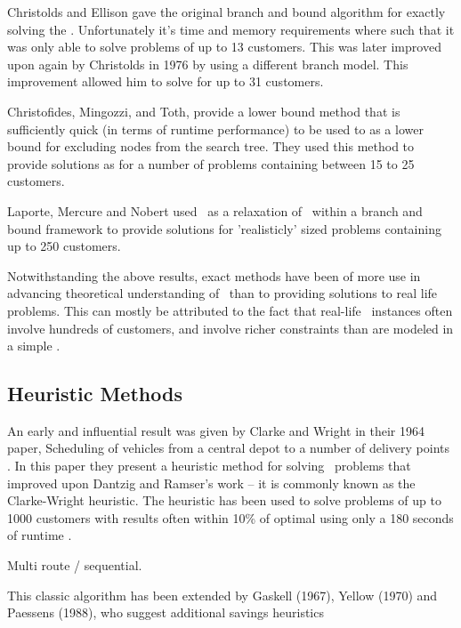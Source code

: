 Christolds and Ellison gave the original branch and bound algorithm for exactly solving the \VRP \cite{CE:1969}. Unfortunately it's time and memory requirements where such that it was only able to solve problems of up to 13 customers. This was later improved upon again by Christolds in 1976 by using a different branch model. This improvement allowed him to solve for up to 31 customers. 

Christofides, Mingozzi, and Toth, \cite{CMT:1981} provide a lower bound method that is sufficiently quick (in terms of runtime performance) to be used to as a lower bound for excluding nodes from the search tree. They used this method to provide solutions as for a number of problems containing between 15 to 25 customers.    
  
Laporte, Mercure and Nobert \cite{LMN:1986} used \MTSP\ as a relaxation of \VRP\ within a branch and bound framework to provide solutions for 'realisticly' sized problems containing up to 250 customers.  

Notwithstanding the above results, exact methods have been of more use in advancing theoretical understanding of \VRP\ than to providing solutions to real life problems. This can mostly be attributed to the fact that real-life \VRP\ instances often involve hundreds of customers, and involve richer constraints than are modeled in a simple \VRP.

\subsection{Heuristic Methods}
An early and influential result was given by Clarke and Wright in their 1964 paper, Scheduling of vehicles from a central depot to a number of delivery points \cite{clark:1964}. In this paper they present a heuristic method for solving \VRP\ problems that improved upon Dantzig and Ramser's work -- it is commonly known as the Clarke-Wright heuristic. The heuristic has been used to solve problems of up to 1000 customers with results often within 10\% of optimal using only a 180 seconds of runtime \cite{TV2001}.

Multi route / sequential.

This classic algorithm has been extended by Gaskell (1967), Yellow (1970) and Paessens (1988), who suggest additional savings heuristics



